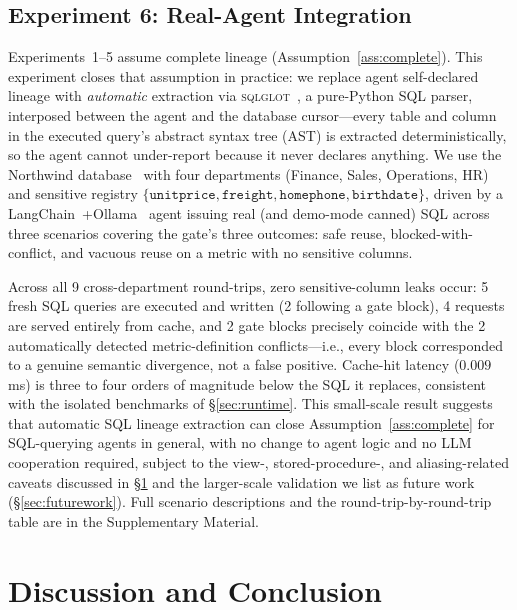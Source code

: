 \documentclass[nolineno]{ieeeaccess}
\begin{document}
\subsection{Experiment 6: Real-Agent Integration}
\label{sec:exp6}

Experiments~1--5 assume complete lineage (Assumption~\ref{ass:complete}).
This experiment closes that assumption in practice: we replace agent
self-declared lineage with \emph{automatic} extraction via
\textsc{sqlglot}~\cite{sqlglot2023}, a pure-Python SQL parser, interposed
between the agent and the database cursor---every table and column in the
executed query's abstract syntax tree (AST) is extracted deterministically, so the agent cannot
under-report because it never declares anything.
We use the Northwind database~\cite{northwind2000} with four departments
(Finance, Sales, Operations, HR) and sensitive registry
$\{\texttt{unitprice},\texttt{freight},\texttt{homephone},\texttt{birthdate}\}$,
driven by a LangChain~\cite{langchain2023}+Ollama~\cite{ollama2024} agent
issuing real (and demo-mode canned) SQL across three scenarios covering the
gate's three outcomes: safe reuse, blocked-with-conflict, and vacuous reuse
on a metric with no sensitive columns.

Across all 9 cross-department round-trips, zero sensitive-column leaks
occur: 5 fresh SQL queries are executed and written (2 following a gate
block), 4 requests are served entirely from cache, and 2 gate blocks
precisely coincide with the 2 automatically detected metric-definition
conflicts---i.e., every block corresponded to a genuine semantic divergence,
not a false positive.
Cache-hit latency ($0.009\,$ms) is three to four orders of magnitude below
the SQL it replaces, consistent with the isolated benchmarks of
\S\ref{sec:runtime}.
This small-scale result suggests that automatic SQL lineage extraction can
close Assumption~\ref{ass:complete} for SQL-querying agents in general, with
no change to agent logic and no LLM cooperation required, subject to the
view-, stored-procedure-, and aliasing-related caveats discussed in
\S\ref{sec:discussion} and the larger-scale validation we list as future
work (\S\ref{sec:futurework}).
Full scenario descriptions and the round-trip-by-round-trip table are in the
Supplementary Material.

\section{Discussion and Conclusion}
\label{sec:discussion}
\end{document}
